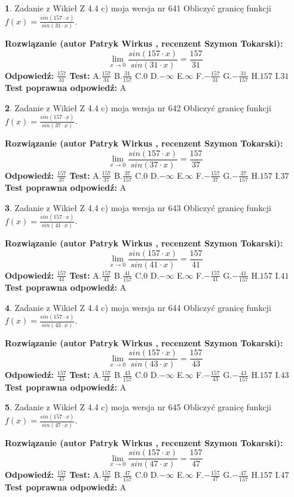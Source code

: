 \documentclass[12pt, a4paper]{article}
\theoremstyle{definition} %
\newtheorem{zad}{}
\newcommand{\zadStart}[1]{\begin{zad}#1\newline}
\newcommand{\zadStop}{\end{zad}}
\newcommand{\rozwStart}[2]{\noindent \textbf{Rozwiązanie (autor #1 , recenzent #2): }\newline}
\newcommand{\rozwStop}{\newline}
\newcommand{\odpStart}{\noindent \textbf{Odpowiedź:}\newline}
\newcommand{\odpStop}{\newline}
\newcommand{\testStart}{\noindent \textbf{Test:}\newline}
\newcommand{\testStop}{\newline}
\newcommand{\kluczStart}{\noindent \textbf{Test poprawna odpowiedź:}\newline}
\newcommand{\kluczStop}{\newline}
\begin{document}
\zadStart{Zadanie z Wikieł Z 4.4 c) moja wersja nr 641}
Obliczyć granicę funkcji $f(x)=\frac{sin(157\cdot x)}{sin(31\cdot x)}$.
\zadStop
\rozwStart{Patryk Wirkus}{Szymon Tokarski}
$$\lim\limits_{x\to 0}\frac{sin(157\cdot x)}{sin(31\cdot x)}=
\frac{157}{31}$$
\rozwStop
\odpStart
$\frac{157}{31}$
\odpStop
\testStart
A.$\frac{157}{31}$
B.$\frac{31}{157}$
C.$0$
D.$-\infty$
E.$\infty$
F.$-\frac{157}{31}$
G.$-\frac{31}{157}$
H.$157$
I.$31$
\testStop
\kluczStart
A
\kluczStop



\zadStart{Zadanie z Wikieł Z 4.4 c) moja wersja nr 642}
Obliczyć granicę funkcji $f(x)=\frac{sin(157\cdot x)}{sin(37\cdot x)}$.
\zadStop
\rozwStart{Patryk Wirkus}{Szymon Tokarski}
$$\lim\limits_{x\to 0}\frac{sin(157\cdot x)}{sin(37\cdot x)}=
\frac{157}{37}$$
\rozwStop
\odpStart
$\frac{157}{37}$
\odpStop
\testStart
A.$\frac{157}{37}$
B.$\frac{37}{157}$
C.$0$
D.$-\infty$
E.$\infty$
F.$-\frac{157}{37}$
G.$-\frac{37}{157}$
H.$157$
I.$37$
\testStop
\kluczStart
A
\kluczStop



\zadStart{Zadanie z Wikieł Z 4.4 c) moja wersja nr 643}
Obliczyć granicę funkcji $f(x)=\frac{sin(157\cdot x)}{sin(41\cdot x)}$.
\zadStop
\rozwStart{Patryk Wirkus}{Szymon Tokarski}
$$\lim\limits_{x\to 0}\frac{sin(157\cdot x)}{sin(41\cdot x)}=
\frac{157}{41}$$
\rozwStop
\odpStart
$\frac{157}{41}$
\odpStop
\testStart
A.$\frac{157}{41}$
B.$\frac{41}{157}$
C.$0$
D.$-\infty$
E.$\infty$
F.$-\frac{157}{41}$
G.$-\frac{41}{157}$
H.$157$
I.$41$
\testStop
\kluczStart
A
\kluczStop



\zadStart{Zadanie z Wikieł Z 4.4 c) moja wersja nr 644}
Obliczyć granicę funkcji $f(x)=\frac{sin(157\cdot x)}{sin(43\cdot x)}$.
\zadStop
\rozwStart{Patryk Wirkus}{Szymon Tokarski}
$$\lim\limits_{x\to 0}\frac{sin(157\cdot x)}{sin(43\cdot x)}=
\frac{157}{43}$$
\rozwStop
\odpStart
$\frac{157}{43}$
\odpStop
\testStart
A.$\frac{157}{43}$
B.$\frac{43}{157}$
C.$0$
D.$-\infty$
E.$\infty$
F.$-\frac{157}{43}$
G.$-\frac{43}{157}$
H.$157$
I.$43$
\testStop
\kluczStart
A
\kluczStop



\zadStart{Zadanie z Wikieł Z 4.4 c) moja wersja nr 645}
Obliczyć granicę funkcji $f(x)=\frac{sin(157\cdot x)}{sin(47\cdot x)}$.
\zadStop
\rozwStart{Patryk Wirkus}{Szymon Tokarski}
$$\lim\limits_{x\to 0}\frac{sin(157\cdot x)}{sin(47\cdot x)}=
\frac{157}{47}$$
\rozwStop
\odpStart
$\frac{157}{47}$
\odpStop
\testStart
A.$\frac{157}{47}$
B.$\frac{47}{157}$
C.$0$
D.$-\infty$
E.$\infty$
F.$-\frac{157}{47}$
G.$-\frac{47}{157}$
H.$157$
I.$47$
\testStop
\kluczStart
A
\kluczStop
\end{document}
